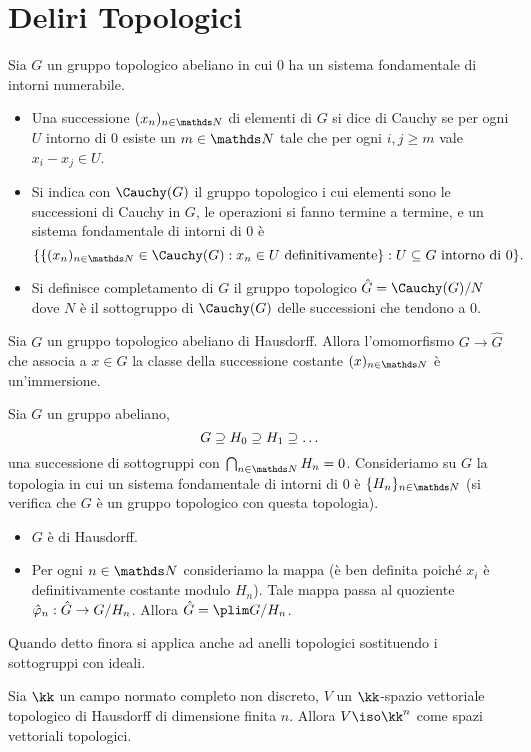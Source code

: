 \section{Deliri Topologici}
\begin{definition}
Sia $G$ un gruppo topologico abeliano in cui $0$ ha un sistema fondamentale di intorni numerabile.
\begin{itemize}
\item Una successione $(x_n)_{n\in\NN}$ di elementi di $G$ si dice di Cauchy se per ogni $U$ intorno di $0$ esiste un $m\in\NN$ tale che per ogni $i,j\ge m$ vale $x_i-x_j\in U$.
\item Si indica con $\Cauchy(G)$ il gruppo topologico i cui elementi sono le successioni di Cauchy in $G$, le operazioni si fanno termine a termine, e un sistema fondamentale di intorni di $0$ è
$$
\{\{(x_n)_{n\in\NN}\in\Cauchy(G):\text{$x_n\in U$ definitivamente}\}:\text{$U\subs G$ intorno di $0$}\}.
$$
\item Si definisce completamento di $G$ il gruppo topologico $\hat{G}=\Cauchy(G)/N$ dove $N$ è il sottogruppo di $\Cauchy(G)$ delle successioni che tendono a $0$.
\end{itemize}
\end{definition}
\begin{proposition}
Sia $G$ un gruppo topologico abeliano di Hausdorff. Allora l'omomorfismo $G\rightarrow\hat{G}$ che associa a $x\in G$ la classe della successione costante $(x)_{n\in\NN}$ è un'immersione.
\end{proposition}

\begin{proposition}
Sia $G$ un gruppo abeliano,
$$
G\supseteq H_0\supseteq H_1\supseteq\ldots
$$
una successione di sottogruppi con $\bigcap_{n\in\NN}H_n=0$. Consideriamo su $G$ la topologia in cui un sistema fondamentale di intorni di $0$ è $\{H_n\}_{n\in\NN}$ (si verifica che $G$ è un gruppo topologico con questa topologia).
\begin{itemize}
\item $G$ è di Hausdorff.
\item Per ogni $n\in\NN$ consideriamo la mappa
(è ben definita poiché $x_i$ è definitivamente costante modulo $H_n$). Tale mappa passa al quoziente $\hat{\varphi}_n:\hat{G}\rightarrow G/H_n$. Allora $\hat{G}=\plim G/H_n$.
\end{itemize}
\end{proposition}
\begin{remark}
Quando detto finora si applica anche ad anelli topologici sostituendo i sottogruppi con ideali.
\end{remark}
\begin{proposition}
Sia $\kk$ un campo normato completo non discreto, $V$ un $\kk$-spazio vettoriale topologico di Hausdorff di dimensione finita $n$. Allora $V\iso\kk^n$ come spazi vettoriali topologici.
\end{proposition}

